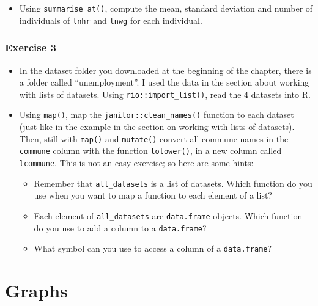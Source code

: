 \documentclass[]{gitbook}
\providecommand{\tightlist}{%
  \setlength{\itemsep}{0pt}\setlength{\parskip}{0pt}}
\begin{document}
\begin{itemize}
\tightlist
\item
  Using \texttt{summarise\_at()}, compute the mean, standard deviation and number of individuals of \texttt{lnhr} and \texttt{lnwg} for each individual.
\end{itemize}

\hypertarget{exercise-3-1}{%
\subsubsection*{Exercise 3}\label{exercise-3-1}}

\begin{itemize}
\item
  In the dataset folder you downloaded at the beginning of the chapter, there is a folder called
  ``unemployment''. I used the data in the section about working with lists of datasets. Using
  \texttt{rio::import\_list()}, read the 4 datasets into R.
\item
  Using \texttt{map()}, map the \texttt{janitor::clean\_names()} function to each dataset (just like in the example
  in the section on working with lists of datasets). Then, still with \texttt{map()} and \texttt{mutate()} convert
  all commune names in the \texttt{commune} column with the function \texttt{tolower()}, in a new column called \texttt{lcommune}.
  This is not an easy exercise; so here are some hints:

  \begin{itemize}
  \tightlist
  \item
    Remember that \texttt{all\_datasets} is a list of datasets. Which function do you use when you want to map a function to each element of a list?
  \item
    Each element of \texttt{all\_datasets} are \texttt{data.frame} objects. Which function do you use to add a column to a \texttt{data.frame}?
  \item
    What symbol can you use to access a column of a \texttt{data.frame}?
  \end{itemize}
\end{itemize}

\hypertarget{graphs}{%
\section{Graphs}\label{graphs}}
\end{document}

